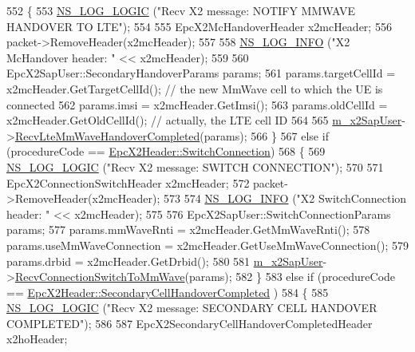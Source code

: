 \begin{DoxyCode}
552     \{
553       \hyperlink{group__logging_ga88acd260151caf2db9c0fc84997f45ce}{NS\_LOG\_LOGIC} (\textcolor{stringliteral}{"Recv X2 message: NOTIFY MMWAVE HANDOVER TO LTE"});
554       
555       EpcX2McHandoverHeader x2mcHeader;
556       packet->RemoveHeader(x2mcHeader);
557 
558       \hyperlink{group__logging_gafbd73ee2cf9f26b319f49086d8e860fb}{NS\_LOG\_INFO} (\textcolor{stringliteral}{"X2 McHandover header: "} << x2mcHeader);
559 
560       EpcX2SapUser::SecondaryHandoverParams params;
561       params.targetCellId = x2mcHeader.GetTargetCellId(); \textcolor{comment}{// the new MmWave cell to which the UE is
       connected}
562       params.imsi = x2mcHeader.GetImsi(); 
563       params.oldCellId = x2mcHeader.GetOldCellId(); \textcolor{comment}{// actually, the LTE cell ID}
564 
565       \hyperlink{classns3_1_1EpcX2_a0a74a3c19067fe18af3021c7b4c24c19}{m\_x2SapUser}->\hyperlink{classns3_1_1EpcX2SapUser_a900e3a0a064301f257351bab3288753d}{RecvLteMmWaveHandoverCompleted}(params);  
566     \}
567   \textcolor{keywordflow}{else} \textcolor{keywordflow}{if} (procedureCode == \hyperlink{classns3_1_1EpcX2Header_afd178c1ed3c47948c587955698a15b0dabadd277dc2cdf05400c9098c496cee3d}{EpcX2Header::SwitchConnection})
568     \{
569       \hyperlink{group__logging_ga88acd260151caf2db9c0fc84997f45ce}{NS\_LOG\_LOGIC} (\textcolor{stringliteral}{"Recv X2 message: SWITCH CONNECTION"});
570       
571       EpcX2ConnectionSwitchHeader x2mcHeader;
572       packet->RemoveHeader(x2mcHeader);
573 
574       \hyperlink{group__logging_gafbd73ee2cf9f26b319f49086d8e860fb}{NS\_LOG\_INFO} (\textcolor{stringliteral}{"X2 SwitchConnection header: "} << x2mcHeader);
575 
576       EpcX2SapUser::SwitchConnectionParams params;
577       params.mmWaveRnti = x2mcHeader.GetMmWaveRnti();
578       params.useMmWaveConnection = x2mcHeader.GetUseMmWaveConnection();
579       params.drbid = x2mcHeader.GetDrbid();
580 
581       \hyperlink{classns3_1_1EpcX2_a0a74a3c19067fe18af3021c7b4c24c19}{m\_x2SapUser}->\hyperlink{classns3_1_1EpcX2SapUser_ae11a4786c547ba2c41aba6c5d4c9d1da}{RecvConnectionSwitchToMmWave}(params);
582     \}
583   \textcolor{keywordflow}{else} \textcolor{keywordflow}{if} (procedureCode == \hyperlink{classns3_1_1EpcX2Header_afd178c1ed3c47948c587955698a15b0da3b5622b54cfa751687a29cea3845339b}{EpcX2Header::SecondaryCellHandoverCompleted}
      )
584     \{
585       \hyperlink{group__logging_ga88acd260151caf2db9c0fc84997f45ce}{NS\_LOG\_LOGIC} (\textcolor{stringliteral}{"Recv X2 message: SECONDARY CELL HANDOVER COMPLETED"});
586 
587       EpcX2SecondaryCellHandoverCompletedHeader x2hoHeader;

\end{DoxyCode}
